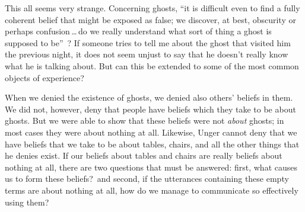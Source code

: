 \documentclass[11pt]{article}
\begin{document}
\begin{spacing}{1.5}
This all seems very strange.  Concerning ghosts, ``it is difficult even to find a fully coherent belief that might be exposed as false; we discover, at best, obscurity or perhaps confusion\,\ldots\,do we really understand what sort of thing a ghost is supposed to be''~\citep[76]{stroud2000a}? If someone tries to tell me about the ghost that visited him the previous night, it does not seem unjust to say that he doesn't really know what he is talking about.  But can this be extended to some of the most common objects of experience?

When we denied the existence of ghosts, we denied also others' beliefs in them.  We did not, however, deny that people have beliefs which they take to be about ghosts.  But we were able to show that these beliefs were not {\em about} ghosts; in most cases they were about nothing at all.  Likewise, Unger cannot deny that we have beliefs that we take to be about tables, chairs, and all the other things that he denies exist.  If our beliefs about tables and chairs are really beliefs about nothing at all, there are two questions that must be answered: first, what causes us to form these beliefs?\ and second, if the utterances containing these empty terms are about nothing at all, how do we manage to communicate so effectively using them?


\end{spacing}
\end{document}
